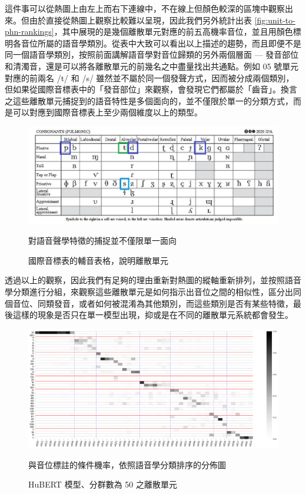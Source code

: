 {        這件事可以從熱圖上由左上而右下連線中，不在線上但顏色較深的區塊中觀察出來。但由於直接從熱圖上觀察比較難以呈現，因此我們另外統計出表 \ref{fig:unit-to-phn-rankings}，其中展現的是幾個離散單元對應的前五高機率音位，並且用顏色標明各音位所屬的語音學類別。從表中大致可以看出以上描述的趨勢，而且即便不是同一個語音學類別，按照前面講解語音學對音位歸類的另外兩個層面 --- 發音部位和清濁音，還是可以將各離散單元的前幾名之中盡量找出共通點。例如 05 號單元對應的前兩名 /t/ 和 /s/ 雖然並不屬於同一個發聲方式，因而被分成兩個類別，但如果從國際音標表中的「發音部位」來觀察，會發現它們都屬於「齒音」。換言之這些離散單元捕捉到的語音特性是多個面向的，並不僅限於單一的分類方式，而是可以對應到國際音標表上至少兩個維度以上的類型。

\begin{figure}
    \centering
    \includegraphics[width=1\linewidth]{figures/ipa_similarity.png}
    \caption[]{
國際音標表的輔音表格，說明離散單元}
                                                                對語音聲學特徵的捕捉並不僅限單一面向
    \label{fig:ipa-cons-table-sim}
\end{figure}

        透過以上的觀察，因此我們有足夠的理由重新對熱圖的縱軸重新排列，並按照語音學分類進行分組，來觀察這些離散單元是如何指示出音位之間的相似性，區分出同個音位、同類發音，或者如何被混淆為其他類別，而這些類別是否有某些特徵，最後這樣的現象是否只在單一模型出現，抑或是在不同的離散單元系統都會發生。

\begin{figure}
    \centering
    \includegraphics[width=1\linewidth]{figures/hubert-50-givenunit-byphn.png}
    \caption[]{%
        HuBERT 模型、分群數為 50 之離散單元}
                                                    與音位標註的條件機率，依照語音學分類排序的分佈圖
    \label{fig:hubert-50-givenunit-byphn}
\end{figure}

}
